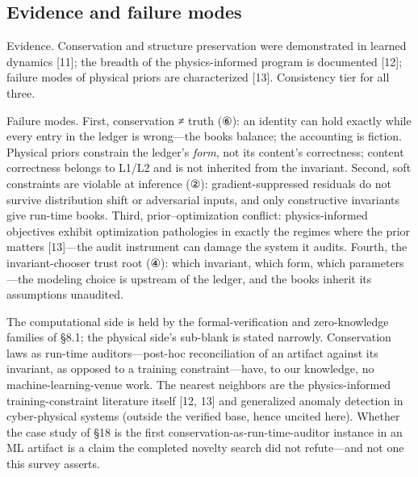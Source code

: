 \documentclass[11pt]{article}
\begin{document}
\subsection{Evidence and failure modes}
\noindent Evidence. Conservation and structure preservation were demonstrated in learned dynamics [11]; the breadth of the physics-informed program is documented [12]; failure modes of physical priors are characterized [13]. Consistency tier for all three.\par
\noindent Failure modes. First, conservation ≠ truth (⑥): an identity can hold exactly while every entry in the ledger is wrong—the books balance; the accounting is fiction. Physical priors constrain the ledger's \emph{form}, not its content's correctness; content correctness belongs to L1/L2 and is not inherited from the invariant. Second, soft constraints are violable at inference (②): gradient-suppressed residuals do not survive distribution shift or adversarial inputs, and only constructive invariants give run-time books. Third, prior–optimization conflict: physics-informed objectives exhibit optimization pathologies in exactly the regimes where the prior matters [13]—the audit instrument can damage the system it audits. Fourth, the invariant-chooser trust root (④): which invariant, which form, which parameters—the modeling choice is upstream of the ledger, and the books inherit its assumptions unaudited.\par
\noindent The computational side is held by the formal-verification and zero-knowledge families of §8.1; the physical side's sub-blank is stated narrowly. Conservation laws as run-time auditors—post-hoc reconciliation of an artifact against its invariant, as opposed to a training constraint—have, to our knowledge, no machine-learning-venue work. The nearest neighbors are the physics-informed training-constraint literature itself [12, 13] and generalized anomaly detection in cyber-physical systems (outside the verified base, hence uncited here). Whether the case study of §18 is the first conservation-as-run-time-auditor instance in an ML artifact is a claim the completed novelty search did not refute—and not one this survey asserts.\par
\end{document}
